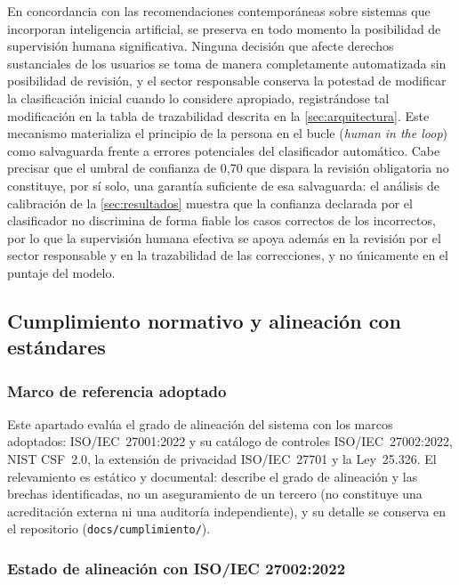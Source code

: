 En concordancia con las recomendaciones contemporáneas sobre sistemas que incorporan inteligencia artificial, se preserva en todo momento la posibilidad de supervisión humana significativa. Ninguna decisión que afecte derechos sustanciales de los usuarios se toma de manera completamente automatizada sin posibilidad de revisión, y el sector responsable conserva la potestad de modificar la clasificación inicial cuando lo considere apropiado, registrándose tal modificación en la tabla de trazabilidad descrita en la \autoref{sec:arquitectura}. Este mecanismo materializa el principio de la persona en el bucle (\emph{human in the loop}) como salvaguarda frente a errores potenciales del clasificador automático. Cabe precisar que el umbral de confianza de 0,70 que dispara la revisión obligatoria no constituye, por sí solo, una garantía suficiente de esa salvaguarda: el análisis de calibración de la \autoref{sec:resultados} muestra que la confianza declarada por el clasificador no discrimina de forma fiable los casos correctos de los incorrectos, por lo que la supervisión humana efectiva se apoya además en la revisión por el sector responsable y en la trazabilidad de las correcciones, y no únicamente en el puntaje del modelo.

\subsection{Cumplimiento normativo y alineación con estándares}\label{subsec:cumplimiento}

\subsubsection{Marco de referencia adoptado}\label{subsec:cumplimiento-marco}

Este apartado evalúa el grado de alineación del sistema con los marcos adoptados: ISO/IEC~27001:2022 y su catálogo de controles ISO/IEC~27002:2022, NIST CSF~2.0, la extensión de privacidad ISO/IEC~27701 y la Ley~25.326. El relevamiento es estático y documental: describe el grado de alineación y las brechas identificadas, no un aseguramiento de un tercero (no constituye una acreditación externa ni una auditoría independiente), y su detalle se conserva en el repositorio (\texttt{docs/cumplimiento/}).

\subsubsection{Estado de alineación con ISO/IEC 27002:2022}\label{subsec:cumplimiento-iso}

